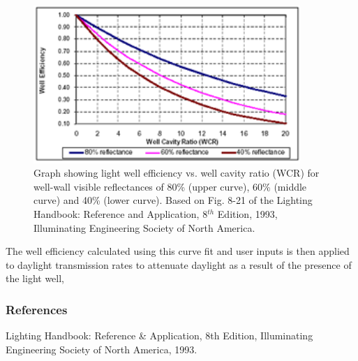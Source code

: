 \begin{figure}[hbtp] %
\centering
\includegraphics[width=0.9\textwidth, height=0.9\textheight, keepaspectratio=true]{media/image910.png}
\caption{Graph showing light well efficiency vs. well cavity ratio (WCR) for well-wall visible reflectances of 80\% (upper curve), 60\% (middle curve) and 40\% (lower curve). Based on Fig. 8-21 of the Lighting Handbook: Reference and Application, 8\(^{th}\) Edition, 1993, Illuminating Engineering Society of North America. \protect \label{fig:graph-showing-light-well-efficiency-vs.-well}}
\end{figure}

The well efficiency calculated using this curve fit and user inputs is then applied to daylight transmission rates to attenuate daylight as a result of the presence of the light well,

\subsubsection{References}\label{references-2-004}

Lighting Handbook: Reference \& Application, 8th Edition, Illuminating Engineering Society of North America, 1993.
